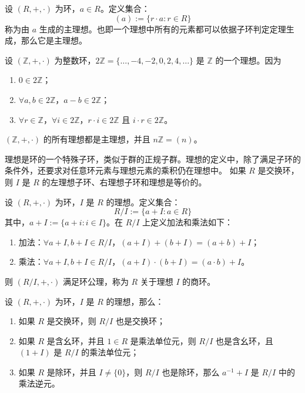 \begin{definition}
    设 $(R,+,\cdot)$ 为环，$a\in R$。定义集合：
    \[
        (a) := \{r\cdot a : r\in R\}
    \]
    称为由 $a$ 生成的主理想。也即一个理想中所有的元素都可以依据子环判定定理生成，那么它是主理想。
    \label{def:principal_ideal}
\end{definition}

\begin{example}
    设 $(\mathbb{Z},+,\cdot)$ 为整数环，$2\mathbb{Z}=\{\ldots,-4,-2,0,2,4,\ldots\}$ 是 $\mathbb{Z}$ 的一个理想。因为
    \begin{enumerate}
        \item $0\in 2\mathbb{Z}$；
        \item $\forall a,b\in 2\mathbb{Z}$，$a-b\in 2\mathbb{Z}$；
        \item $\forall r\in \mathbb{Z}$，$\forall i\in 2\mathbb{Z}$，$r\cdot i \in 2\mathbb{Z}$ 且 $i\cdot r \in 2\mathbb{Z}$。
    \end{enumerate}
    $(\mathbb{Z},+,\cdot)$ 的所有理想都是主理想，并且 $n\mathbb{Z}=(n)$。
\end{example}

\begin{note}
    理想是环的一个特殊子环，类似于群的正规子群。理想的定义中，除了满足子环的条件外，还要求对任意环元素与理想元素的乘积仍在理想中。
    如果 $R$ 是交换环，则 $I$ 是 $R$ 的左理想子环、右理想子环和理想是等价的。
\end{note}

\vspace{1em}

\begin{definition}
    设 $(R,+,\cdot)$ 为环，$I$ 是 $R$ 的理想。定义集合：
    \[
        R/I := \{a+I : a\in R\}
    \]
    其中，$a+I := \{a+i : i\in I\}$。在 $R/I$ 上定义加法和乘法如下：
    \begin{enumerate}
        \item 加法：$\forall a+I,b+I\in R/I$，$(a+I)+(b+I)=(a+b)+I$；
        \item 乘法：$\forall a+I,b+I\in R/I$，$(a+I)\cdot(b+I)=(a\cdot b)+I$。
    \end{enumerate}
    则 $(R/I,+,\cdot)$ 满足环公理，称为 $R$ 关于理想 $I$ 的商环。
    \label{def:quotient_ring}
\end{definition}

\begin{proposition}[商环的性质]
    设 $(R,+,\cdot)$ 为环，$I$ 是 $R$ 的理想，那么：
    \begin{enumerate}
        \item 如果 $R$ 是交换环，则 $R/I$ 也是交换环；
        \item 如果 $R$ 是含幺环，并且 $1\in R$ 是乘法单位元，则 $R/I$ 也是含幺环，且 $(1+I)$ 是 $R/I$ 的乘法单位元；
        \item 如果 $R$ 是除环，并且 $I\neq \{0\}$，则 $R/I$ 也是除环，那么 $a^{-1}+I$ 是 $R/I$ 中的乘法逆元。
    \end{enumerate}
\end{proposition}

